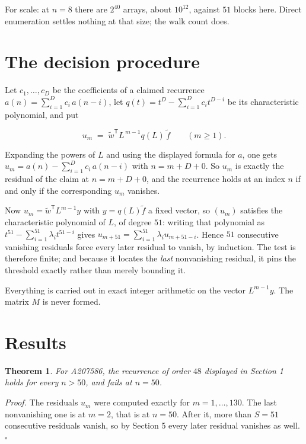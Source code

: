\documentclass[11pt]{article}
\newtheorem{theorem}{Theorem}
\theoremstyle{definition}
\begin{document}
For scale: at $n = 8$ there are $2^{40}$ arrays, about $10^{12}$, against $51$ blocks here. Direct enumeration settles nothing at that size; the walk count does.

\section{The decision procedure}

Let $c_1,\dots,c_D$ be the coefficients of a claimed recurrence $a(n) = \sum_{i=1}^{D} c_i\,a(n-i)$, let $q(t) = t^{D} - \sum_{i=1}^{D} c_i t^{D-i}$ be its characteristic polynomial, and put

\[u_m \;=\; \tilde w^{\mathsf T} L^{\,m-1} q(L)\,\tilde f \qquad (m \ge 1).\]

Expanding the powers of $L$ and using the displayed formula for $a$, one gets $u_m = a(n) - \sum_{i=1}^{D} c_i\,a(n-i)$ with $n = m + D + 0$. So $u_m$ is exactly the residual of the claim at $n = m + D + 0$, and the recurrence holds at an index $n$ if and only if the corresponding $u_m$ vanishes.

Now $u_m = \tilde w^{\mathsf T} L^{m-1} y$ with $y = q(L)\tilde f$ a fixed vector, so $(u_m)$ satisfies the characteristic polynomial of $L$, of degree $51$: writing that polynomial as $t^{51} - \sum_{i=1}^{51} \lambda_i t^{51-i}$ gives $u_{m+51} = \sum_{i=1}^{51} \lambda_i u_{m+51-i}$. Hence $51$ consecutive vanishing residuals force every later residual to vanish, by induction. The test is therefore finite; and because it locates the {\itshape last} nonvanishing residual, it pins the threshold exactly rather than merely bounding it.

Everything is carried out in exact integer arithmetic on the vector $L^{m-1}y$. The matrix $M$ is never formed.

\section{Results}

\begin{theorem} For A207586, the recurrence of order $48$ displayed in Section 1 holds for every $n > 50$, and fails at $n = 50$.\end{theorem}

{\itshape Proof.} The residuals $u_m$ were computed exactly for $m = 1,\dots,130$. The last nonvanishing one is at $m = 2$, that is at $n = 50$. After it, more than $S = 51$ consecutive residuals vanish, so by Section 5 every later residual vanishes as well. $\square$
\end{document}
